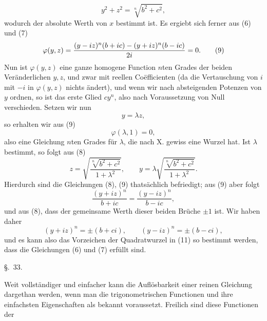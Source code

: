 
\begin{equation}
 y^2+z^2=\sqrt[n]{b^2+c^2},
\tag{8}
\end{equation}
wodurch der absolute Werth von $x$ bestimmt ist. Es ergiebt sich ferner aus (6) und (7)
\begin{equation}
 \varphi(y,z)={ (y-iz)^n(b+ic)-(y+iz)^n(b-ic) \over 2i}=0.
\tag{9}
\end{equation}
Nun ist $\varphi(y,z)$ eine ganze homogene Function $n$ten Grades der beiden Veränderlichen $y,z$, und zwar mit reellen Coëfficienten (da die Vertauschung von $i$ mit $-i$ in $\varphi(y,z)$ nichts ändert), und wenn wir nach absteigenden Potenzen von $y$ ordnen, so ist das erste Glied $cy^n$, also nach Voraussetzung von Null verschieden. Setzen wir nun
\[
 y=\lambda z,
\]
so erhalten wir aus (9)
\begin{equation}
 \varphi(\lambda,1)=0,
\tag{10}
\end{equation}
also eine Gleichung $n$ten Grades für $\lambda$, die nach X. gewiss eine Wurzel hat. Ist $\lambda$ bestimmt, so folgt aus (8)
\begin{equation}
 z=\sqrt{\frac{\sqrt[n]{b^2+c^2}}{1+\lambda^2}},\qquad
 y=\lambda\sqrt{\frac{\sqrt[n]{b^2+c^2}}{1+\lambda^2}}.
\tag{11}
\end{equation}
Hierdurch sind die Gleichungen (8), (9) thatsächlich befriedigt; aus (9) aber folgt
\[
 \frac{(y+iz)^n}{b+ic}=\frac{(y-iz)^n}{b-ic},
\]
und aus (8), dass der gemeinsame Werth dieser beiden Brüche $\pm 1$ ist. Wir haben daher
\[
 (y+iz)^n=\pm(b+ci),\qquad (y-iz)^n=\pm(b-ci),
\]
und es kann also das Vorzeichen der Quadratwurzel in (11) so bestimmt werden, dass die Gleichungen (6) und (7) erfüllt sind.

\begin{center}
{\large \S.\ 33.}

\vspace{0.5em}
{\large{}}
\end{center}

Weit vollständiger und einfacher kann die Auflösbarkeit einer reinen Gleichung dargethan werden, wenn man die trigonometrischen Functionen und ihre einfachsten Eigenschaften als bekannt voraussetzt. Freilich sind diese Functionen der
